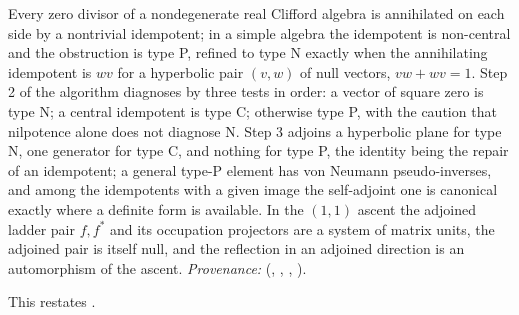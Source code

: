Every zero divisor of a nondegenerate real Clifford algebra is annihilated on each side by a nontrivial idempotent; in a simple algebra the idempotent is non-central and the obstruction is type P, refined to type N exactly when the annihilating idempotent is $wv$ for a hyperbolic pair $(v, w)$ of null vectors, $vw + wv = 1$. Step 2 of the algorithm diagnoses by three tests in order: a vector of square zero is type N; a central idempotent is type C; otherwise type P, with the caution that nilpotence alone does not diagnose N. Step 3 adjoins a hyperbolic plane for type N, one generator for type C, and nothing for type P, the identity being the repair of an idempotent; a general type-P element has von Neumann pseudo-inverses, and among the idempotents with a given image the self-adjoint one is canonical exactly where a definite form is available. In the $(1,1)$ ascent the adjoined ladder pair $f, f^{*}$ and its occupation projectors are a system of matrix units, the adjoined pair is itself null, and the reflection in an adjoined direction is an automorphism of the ascent. \emph{Provenance:} \cite[Def.~3.1, Ex.~3.5, Thm.~3.9, Thm.~4.2, Rem.~5.8, Prop.~6.1, Rem.~6.6, Thm.~7.1, Prop.~7.8, Table~1]{ButlerT1} (, , , ).

This restates .
